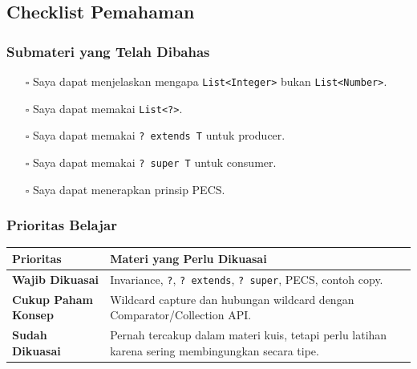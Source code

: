 \subsection{Checklist Pemahaman}

\subsubsection{Submateri yang Telah Dibahas}

\begin{itemize}
    \item[$\square$] Saya dapat menjelaskan mengapa \texttt{List<Integer>} bukan \texttt{List<Number>}.
    \item[$\square$] Saya dapat memakai \texttt{List<?>}.
    \item[$\square$] Saya dapat memakai \texttt{? extends T} untuk producer.
    \item[$\square$] Saya dapat memakai \texttt{? super T} untuk consumer.
    \item[$\square$] Saya dapat menerapkan prinsip PECS.
\end{itemize}

\subsubsection{Prioritas Belajar}

\begin{tabularx}{\textwidth}{|L{0.22\textwidth}|X|}
\hline
\textbf{Prioritas} & \textbf{Materi yang Perlu Dikuasai} \\
\hline
\textbf{Wajib Dikuasai} & Invariance, \texttt{?}, \texttt{? extends}, \texttt{? super}, PECS, contoh copy. \\
\hline
\textbf{Cukup Paham Konsep} & Wildcard capture dan hubungan wildcard dengan Comparator/Collection API. \\
\hline
\textbf{Sudah Dikuasai} & Pernah tercakup dalam materi kuis, tetapi perlu latihan karena sering membingungkan secara tipe. \\
\hline
\end{tabularx}
